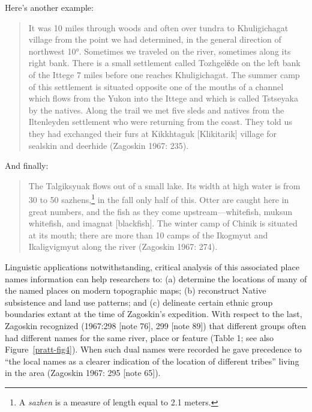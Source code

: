 \noindent
Here’s another example:

\begin{quote}
    It was 10 miles through woods and often over tundra to Khuligichagat village from the point we had determined, in the general direction of northwest 10°. Sometimes we traveled on the river, sometimes along its right bank. There is a small settlement called Tozhgelёde on the left bank of the Ittege 7 miles before one reaches Khuligichagat. The summer camp of this settlement is situated opposite one of the mouths of a channel which flows from the Yukon into the Ittege and which is called Tstseyaka by the natives. Along the trail we met five sleds and natives from the Iltenleyden settlement who were returning from the coast. They told us they had exchanged their furs at Kikkhtaguk [Klikitarik] village for sealskin and deerhide (Zagoskin 1967: 235).
\end{quote}

\noindent
And finally:

\begin{quote}
    The Talgiksyuak flows out of a small lake. Its width at high water is from 30 to 50 sazhens,\footnote{A \textit{sazhen} is a measure of length equal to 2.1 meters. } in the fall only half of this. Otter are caught here in great numbers, and the fish as they come upstream—whitefish, muksun whitefish, and imagnat [blackfish]. The winter camp of Chinik is situated at its mouth; there are more than 10 camps of the Ikogmyut and Ikaligvigmyut along the river (Zagoskin 1967: 274).
\end{quote}

Linguistic applications notwithstanding, critical analysis of this associated place names information can help researchers to: (a) determine the locations of many of the named places on modern topographic maps; (b) reconstruct Native subsistence and land use patterns; and (c) delineate certain ethnic group boundaries extant at the time of Zagoskin’s expedition. With respect to the last, Zagoskin recognized (1967:298 [note 76], 299 [note 89]) that different groups often had different names for the same river, place or feature (Table 1; see also Figure~\ref{pratt-fig4}). When such dual names were recorded he gave precedence to “the local names as a clearer indication of the location of different tribes” living in the area (Zagoskin 1967: 295 [note 65]).


